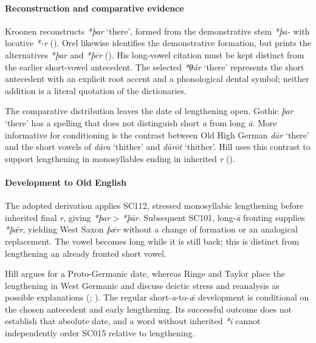 \documentclass[
  british,
  a4paper,
]{article}
\providecommand{\Recon}[1]{\emph{*#1}}
\begin{document}
\paragraph{Reconstruction and comparative
evidence}\label{reconstruction-and-comparative-evidence-63}

Kroonen reconstructs \Recon{þar} `there', formed from the demonstrative
stem \emph{*þa-} with locative \emph{*-r}
(). Orel likewise
identifies the demonstrative formation, but prints the alternatives
\emph{*þar} and \emph{*þēr} ().
His long-vowel citation must be kept distinct from the earlier
short-vowel antecedent. The selected \Recon{θár} `there' represents the
short antecedent with an explicit root accent and a phonological dental
symbol; neither addition is a literal quotation of the dictionaries.

The comparative distribution leaves the date of lengthening open. Gothic
\emph{þar} `there' has a spelling that does not distinguish short
\emph{a} from long \emph{ā}. More informative for conditioning is the
contrast between Old High German \emph{dār} `there' and the short vowels
of \emph{dăra} `thither' and \emph{dărōt} `thither'. Hill uses this
contrast to support lengthening in monosyllables ending in inherited
\emph{r} ().

\paragraph{Development to Old
English}\label{development-to-old-english-64}

The adopted derivation applies SC112, stressed monosyllabic lengthening
before inherited final \emph{r}, giving \emph{*þar} \textgreater{}
\emph{*þār}. Subsequent SC101, long-\emph{ā} fronting supplies
\emph{*þǣr}, yielding West Saxon \emph{þǣr} without a change of
formation or an analogical replacement. The vowel becomes long while it
is still back; this is distinct from lengthening an already fronted
short vowel.

Hill argues for a Proto-Germanic date, whereas Ringe and Taylor place
the lengthening in West Germanic and discuss deictic stress and
reanalysis as possible explanations (; ).
The regular short-\emph{a}-to-\emph{ǣ} development is conditional on the
chosen antecedent and early lengthening. Its successful outcome does not
establish that absolute date, and a word without inherited \emph{*i}
cannot independently order SC015 relative to lengthening.
\end{document}
